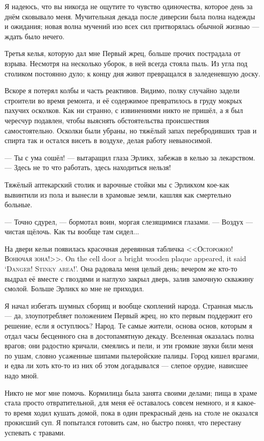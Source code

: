 Я надеюсь, что вы никогда не ощутите то чувство одиночества, которое день за днём сковывало меня.
Мучительная декада после диверсии была полна надежды и ожидания;
новая волна мучений изо всех сил притворялась обычной жизнью --- ждать было нечего.

Третья келья, которую дал мне Первый жрец, больше прочих пострадала от взрыва.
Несмотря на несколько уборок, в ней всегда стояла пыль.
Из угла под столиком постоянно дуло;
к концу дня живот превращался в заледеневшую доску.

Вскоре я потерял колбы и часть реактивов.
Видимо, полку случайно задели строители во время ремонта, и её содержимое превратилось в груду мокрых пахучих осколков.
Как ни странно, с извинениями никто не пришёл, а я был чересчур подавлен, чтобы выяснять обстоятельства происшествия самостоятельно.
Осколки были убраны, но тяжёлый запах перебродивших трав и спирта так и остался висеть в воздухе, делая работу невыносимой.

--- Ты с ума сошёл! --- вытаращил глаза Эрликх, забежав в келью за лекарством.
--- Здесь не то что работать, здесь находиться нельзя!

Тяжёлый аптекарский столик и варочные стойки мы с Эрликхом кое-как вывинтили из пола и вынесли в храмовые земли, кашляя как смертельно больные.

--- Точно сдурел, --- бормотал воин, моргая слезящимися глазами.
--- Воздух --- чистая щёлочь.
Как ты вообще там сидел...

{На двери кельи появилась красочная деревянная табличка <<\textsc{Осторожно! Вонючая зона!}>>.}
{On the cell door a bright wooden plaque appeared, it said `\textsc{Danger! Stinky area!}'.}
Она радовала меня целый день;
вечером же кто-то выдрал её вместе с гвоздями и наглухо закрыл дверь, залив замочную скважину смолой.
Больше Эрликх ко мне не приходил.

Я начал избегать шумных сборищ и вообще скоплений народа.
Странная мысль --- да, злоупотребляет положением Первый жрец, но кто первым поддержит его решение, если я оступлюсь?
Народ.
Те самые жители, основа основ, которым я отдал часы бесценного сна в достопамятную декаду.
Вселенная оказалась полна врагов;
они радостно кричали, смеялись и пели, и эти громкие звуки били меня по ушам, словно усаженные шипами пылеройские палицы.
Город кишел врагами, и едва ли хоть кто-то из них об этом догадывался --- слепое орудие, нависшее надо мной.

Никто не мог мне помочь.
Кормилица была занята своими делами;
пища в храме стала просто отвратительной, для меня её оставалось совсем немного, и я какое-то время ходил кушать домой, пока в один прекрасный день на столе не оказался прокисший суп.
Я попытался готовить сам, но быстро понял, что перестану успевать с травами.

